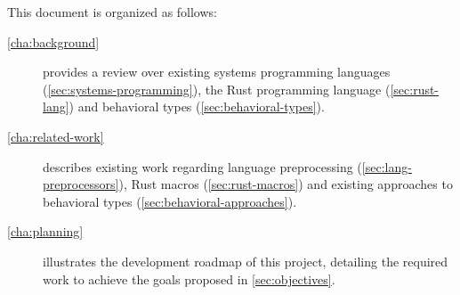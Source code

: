 This document is organized as follows:

\begin{description}
    \item [\autoref{cha:background}] provides a review over
          existing systems programming languages (\autoref{sec:systems-programming}),
          the Rust programming language (\autoref{sec:rust-lang}) and
          behavioral types (\autoref{sec:behavioral-types}).
    \item [\autoref{cha:related-work}] describes existing work regarding
          language preprocessing (\autoref{sec:lang-preprocessors}),
          Rust macros (\autoref{sec:rust-macros}) and
          existing approaches to behavioral types (\autoref{sec:behavioral-approaches}).
    \item [\autoref{cha:planning}] illustrates the development roadmap of this project,
          detailing the required work to achieve the goals proposed in \autoref{sec:objectives}.
\end{description}